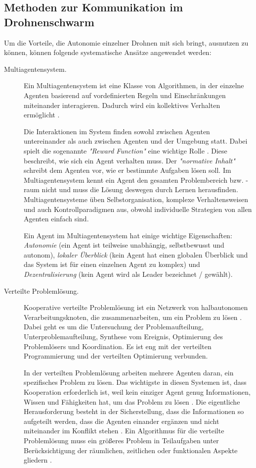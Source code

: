 \subsection{Methoden zur Kommunikation im Drohnenschwarm}

Um die Vorteile, die Autonomie einzelner Drohnen mit sich bringt, ausnutzen zu können, können folgende systematische Ansätze angewendet werden:

\begin{description} 
	\item[Multiagentensystem.] Ein Multiagentensystem ist eine Klasse von Algorithmen, in der einzelne Agenten basierend auf vordefinierten Regeln und Einschränkungen miteinander interagieren. Dadurch wird ein kollektives Verhalten ermöglicht \cite{Salamon2011}.
	
	Die Interaktionen im System finden sowohl zwischen Agenten untereinander als auch zwischen Agenten und der Umgebung statt. Dabei spielt die sogenannte \textit{"Reward Function"} eine wichtige Rolle \cite{Panait05cooperativemulti-agent}. Diese beschreibt, wie sich ein Agent verhalten muss. Der \textit{"normative Inhalt"} schreibt dem Agenten vor, wie er bestimmte Aufgaben lösen soll. Im Multiagentensystem kennt ein Agent den gesamten Problembereich bzw. -raum  nicht und muss die Lösung deswegen durch Lernen herausfinden. Multiagentensysteme üben Selbstorganisation, komplexe Verhaltensweisen und auch Kontrollparadigmen aus, obwohl individuelle Strategien von allen Agenten einfach sind.
	
	Ein Agent im Multiagentensystem hat einige wichtige Eigenschaften: \textit{Autonomie} (ein Agent ist teilweise unabhängig, selbstbewusst und autonom), \textit{lokaler Überblick} (kein Agent hat einen globalen Überblick und das System ist für einen einzelnen Agent zu komplex) und \textit{Dezentralisierung} (kein Agent wird als Leader bezeichnet / gewählt).
	
	\item[Verteilte Problemlösung.] Kooperative verteilte Problemlösung ist ein Netzwerk von halbautonomen Verarbeitungsknoten, die zusammenarbeiten, um ein Problem zu lösen \cite{Shoham:2009p113}. Dabei geht es um die Untersuchung der Problemaufteilung, Unterproblemaufteilung, Synthese vom Ereignis, Optimierung des Problemlösers und Koordination. Es ist eng mit der verteilten Programmierung und der verteilten Optimierung verbunden.
	
	In der verteilten Problemlösung arbeiten mehrere Agenten daran, ein spezifisches Problem zu lösen. Das wichtigste in diesen Systemen ist, dass Kooperation erforderlich ist, weil kein einziger Agent genug Informationen, Wissen und Fähigkeiten hat, um das Problem zu lösen \cite{Shoham:2009p113}. Die eigentliche Herausforderung besteht in der Sicherstellung, dass die Informationen so aufgeteilt werden, dass die Agenten einander ergänzen und nicht miteinander im Konflikt stehen \cite{Shoham:2009p113}. Ein Algorithmus für die verteilte Problemlösung muss ein größeres Problem in Teilaufgaben unter Berücksichtigung der räumlichen, zeitlichen oder funktionalen Aspekte gliedern \cite{Shoham:2009p113}.
	

\end{description}
